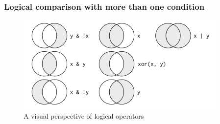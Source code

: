 \documentclass[xcolor=dvipsnames, xcolor=table]{beamer} %
\theoremstyle{mystyle}
\begin{document}
\begin{frame}[fragile] %
\frametitle{Logical comparison with more than one condition}

\begin{figure}
\includegraphics[scale=.8]{logical.png}
\caption{A visual perspective of logical operators}
\end{figure}

\end{frame}
\end{document}
